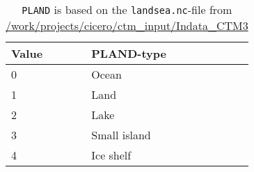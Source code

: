 \begin{table}[]
\centering
\begin{tabular}{|l|l|}
\hline
Value & PLAND-type   \\ \hline
0     & Ocean        \\ \hline
1     & Land         \\ \hline
2     & Lake         \\ \hline
3     & Small island \\ \hline
4     & Ice shelf    \\ \hline
\end{tabular}
\caption{\texttt{PLAND} is based on the \texttt{landsea.nc}-file from \protect\url{/work/projects/cicero/ctm_input/Indata_CTM3}}
\label{tab:PLAND}
\end{table}